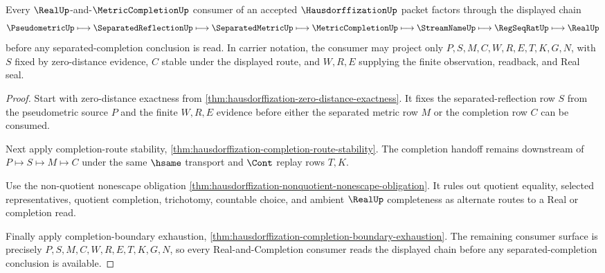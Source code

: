 \begin{theorem}
\label{thm:hausdorffization-real-completion-consumer-factorization}
Every $\RealUp$-and-$\MetricCompletionUp$ consumer of an accepted $\HausdorffizationUp$ packet factors through the displayed chain
$$
\PseudometricUp
\longmapsto
\SeparatedReflectionUp
\longmapsto
\SeparatedMetricUp
\longmapsto
\MetricCompletionUp
\longmapsto
\StreamNameUp
\longmapsto
\RegSeqRatUp
\longmapsto
\RealUp
$$
before any separated-completion conclusion is read. In carrier notation, the consumer may project only $P,S,M,C,W,R,E,T,K,G,N$, with $S$ fixed by zero-distance evidence, $C$ stable under the displayed route, and $W,R,E$ supplying the finite observation, readback, and Real seal.
\end{theorem}
\begin{proof}
Start with zero-distance exactness from \autoref{thm:hausdorffization-zero-distance-exactness}. It fixes the separated-reflection row $S$ from the pseudometric source $P$ and the finite $W,R,E$ evidence before either the separated metric row $M$ or the completion row $C$ can be consumed.

Next apply completion-route stability, \autoref{thm:hausdorffization-completion-route-stability}. The completion handoff remains downstream of $P \longmapsto S \longmapsto M \longmapsto C$ under the same $\hsame$ transport and $\Cont$ replay rows $T,K$.

Use the non-quotient nonescape obligation \autoref{thm:hausdorffization-nonquotient-nonescape-obligation}. It rules out quotient equality, selected representatives, quotient completion, trichotomy, countable choice, and ambient $\RealUp$ completeness as alternate routes to a Real or completion read.

Finally apply completion-boundary exhaustion, \autoref{thm:hausdorffization-completion-boundary-exhaustion}. The remaining consumer surface is precisely $P,S,M,C,W,R,E,T,K,G,N$, so every Real-and-Completion consumer reads the displayed chain before any separated-completion conclusion is available.
\end{proof}


